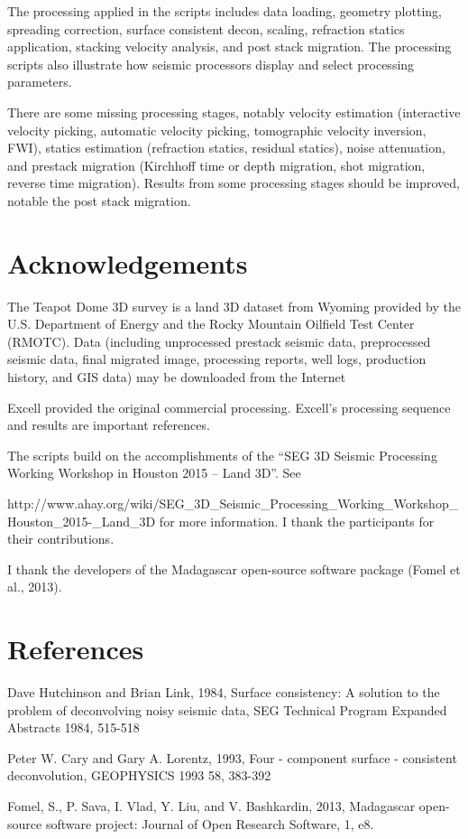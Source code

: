 The processing applied in the scripts includes data loading, geometry plotting, spreading correction, surface consistent decon, scaling, refraction statics application, stacking velocity analysis, and post stack migration.  The processing scripts also illustrate how seismic processors display and select processing parameters. 

There are some missing processing stages, notably velocity estimation (interactive velocity picking, automatic velocity picking, tomographic velocity inversion, FWI), statics estimation (refraction statics, residual statics), noise attenuation, and prestack migration (Kirchhoff time or depth migration, shot migration, reverse time migration).  Results from some processing stages should be improved, notable the post stack migration.

\section{Acknowledgements} 

The Teapot Dome 3D survey is a land 3D dataset from Wyoming provided by the U.S. Department of Energy and the Rocky Mountain Oilfield Test Center (RMOTC).  Data (including unprocessed prestack seismic data, preprocessed seismic data, final migrated image, processing reports, well logs, production history, and GIS data) may be downloaded from the Internet

Excell provided the original commercial processing.  Excell's processing sequence and results are important references.

The scripts build on the accomplishments of the “SEG 3D Seismic Processing Working Workshop in Houston 2015 – Land 3D”.  See 

http://www.ahay.org/wiki/SEG\_3D\_Seismic\_Processing\_Working\_Workshop\_Houston\_2015-\_Land\_3D for more information.  I thank the participants for their contributions.

I thank the developers of the Madagascar open-source software package (Fomel et al., 2013).

\section{References}

Dave Hutchinson and Brian Link, 1984, Surface consistency: A solution to the problem of deconvolving noisy seismic data,  SEG Technical Program Expanded Abstracts 1984, 515-518 

 Peter W. Cary and Gary A. Lorentz, 1993, Four - component surface - consistent deconvolution, GEOPHYSICS 1993 58, 383-392 

Fomel, S., P. Sava, I. Vlad, Y. Liu, and V. Bashkardin, 2013, Madagascar open-source software project: Journal of Open Research Software, 1, e8. 


